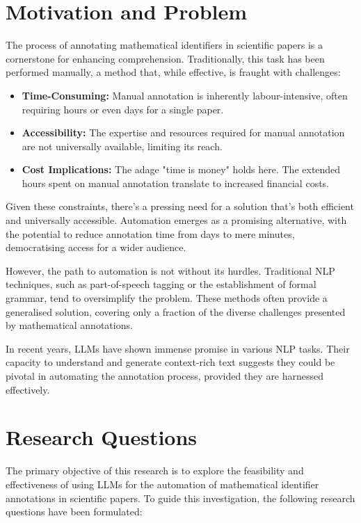 \section{Motivation and Problem}

The process of annotating mathematical identifiers in scientific papers is a cornerstone for enhancing comprehension. Traditionally, this task has been performed manually, a method that, while effective, is fraught with challenges:

\begin{itemize}
    \item \textbf{Time-Consuming:} Manual annotation is inherently labour-intensive, often requiring hours or even days for a single paper.
    
    \item \textbf{Accessibility:} The expertise and resources required for manual annotation are not universally available, limiting its reach.
    
    \item \textbf{Cost Implications:} The adage "time is money" holds here. The extended hours spent on manual annotation translate to increased financial costs.
\end{itemize}

Given these constraints, there's a pressing need for a solution that's both efficient and universally accessible. Automation emerges as a promising alternative, with the potential to reduce annotation time from days to mere minutes, democratising access for a wider audience.

However, the path to automation is not without its hurdles. Traditional \ac{NLP} techniques, such as part-of-speech tagging or the establishment of formal grammar, tend to oversimplify the problem. These methods often provide a generalised solution, covering only a fraction of the diverse challenges presented by mathematical annotations. 

In recent years, LLMs have shown immense promise in various NLP tasks. Their capacity to understand and generate context-rich text suggests they could be pivotal in automating the annotation process, provided they are harnessed effectively.

\section{Research Questions}

The primary objective of this research is to explore the feasibility and effectiveness of using LLMs for the automation of mathematical identifier annotations in scientific papers. To guide this investigation, the following research questions have been formulated:

